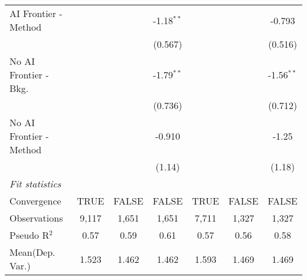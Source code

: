 \begin{tabular}{lcccccc}
   AI Frontier - Method    &              &              & -1.18$^{**}$ &               &              & -0.793\\   
                           &              &              & (0.567)      &               &              & (0.516)\\   
   No AI Frontier - Bkg.   &              &              & -1.79$^{**}$ &               &              & -1.56$^{**}$\\   
                           &              &              & (0.736)      &               &              & (0.712)\\   
   No AI Frontier - Method &              &              & -0.910       &               &              & -1.25\\   
                           &              &              & (1.14)       &               &              & (1.18)\\   
   \midrule
   \emph{Fit statistics}\\
   Convergence             &TRUE          & FALSE        & FALSE        & TRUE          & FALSE        & FALSE\\  
   Observations            & 9,117        & 1,651        & 1,651        & 7,711         & 1,327        & 1,327\\  
   Pseudo R$^2$            & 0.57         & 0.59         & 0.61         & 0.57          & 0.56         & 0.58\\  
Mean(Dep. Var.) & 1.523 & 1.462 & 1.462 & 1.593 & 1.469 & 1.469 \\
   

\end{tabular}
